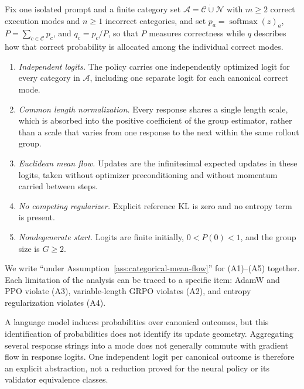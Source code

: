 \begin{assumption}
\label{ass:categorical-mean-flow}
Fix one isolated prompt and a finite category set
$\mathcal A=\mathcal C\mathbin{\dot\cup}\mathcal N$ with $m\ge2$ correct
execution modes and $n\ge1$ incorrect categories, and set
$p_a=\operatorname{softmax}(z)_a$, $P=\sum_{c\in\mathcal C}p_c$, and
$q_c=p_c/P$, so that $P$ measures correctness while $q$ describes how that
correct probability is allocated among the individual correct modes.
\begin{enumerate}
\item[(A1)] \emph{Independent logits.} The policy carries one independently
  optimized logit for every category in $\mathcal A$, including one separate
  logit for each canonical correct mode.
\item[(A2)] \emph{Common length normalization.} Every response shares a single
  length scale, which is absorbed into the positive coefficient of the group
  estimator, rather than a scale that varies from one response to the next
  within the same rollout group.
\item[(A3)] \emph{Euclidean mean flow.} Updates are the infinitesimal expected
  updates in these logits, taken without optimizer preconditioning and without
  momentum carried between steps.
\item[(A4)] \emph{No competing regularizer.} Explicit reference KL is zero and
  no entropy term is present.
\item[(A5)] \emph{Nondegenerate start.} Logits are finite initially,
  $0<P(0)<1$, and the group size is $G\ge2$.
\end{enumerate}
\end{assumption}

We write ``under Assumption~\ref{ass:categorical-mean-flow}'' for (A1)--(A5)
together. Each limitation of the analysis can be traced to a specific item:
AdamW and PPO violate (A3), variable-length GRPO violates (A2), and entropy
regularization violates (A4).

A language model induces probabilities over canonical outcomes, but this
identification of probabilities does not identify its update geometry.
Aggregating several response strings into a mode does not generally commute
with gradient flow in response logits. One independent logit per canonical
outcome is therefore an explicit abstraction, not a reduction proved for the
neural policy or its validator equivalence classes.

